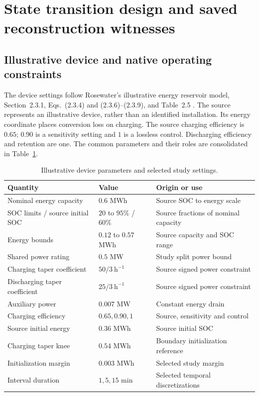 \section{State transition design and saved reconstruction witnesses}\label{sec:transitions}
\subsection{Illustrative device and native operating constraints}
The device settings follow Rosewater's illustrative energy reservoir model,
Section~2.3.1, Eqs.~(2.3.4) and (2.3.6)--(2.3.9), and Table~2.5
\cite{rosewater2020battery}. The source represents an illustrative device,
rather than an identified installation. Its energy coordinate places
conversion loss on charging. The source charging efficiency is $0.65$;
$0.90$ is a sensitivity setting and $1$ is a lossless control. Discharging
efficiency and retention are one. The common parameters and their roles
are consolidated in Table~\ref{tab:internal_parameters}.

\begin{table}[htbp]
\caption{Illustrative device parameters and selected study settings.}\label{tab:internal_parameters}
\begin{tabularx}{\linewidth}{@{}p{.33\linewidth} p{.26\linewidth} X@{}}
\toprule Quantity & Value & Origin or use\\\midrule
Nominal energy capacity & $0.6$ MWh & Source SOC to energy scale\\
SOC limits / source initial SOC & $20$ to $95\%$ / $60\%$ & Source fractions of nominal capacity\\
Energy bounds & $0.12$ to $0.57$ MWh & Source capacity and SOC range\\
Shared power rating & $0.5$ MW & Study split power bound\\
Charging taper coefficient & $50/3~\mathrm{h}^{-1}$ & Source signed power constraint\\
Discharging taper coefficient & $25/3~\mathrm{h}^{-1}$ & Source signed power constraint\\
Auxiliary power & $0.007$ MW & Constant energy drain\\
Charging efficiency & $0.65,0.90,1$ & Source, sensitivity and control\\
Source initial energy & $0.36$ MWh & Source initial SOC\\
Charging taper knee & $0.54$ MWh & Boundary initialization reference\\
Initialization margin & $0.003$ MWh & Selected study margin\\
Interval duration & $1,5,15$ min & Selected temporal discretizations\\
\bottomrule\end{tabularx}
\end{table}

